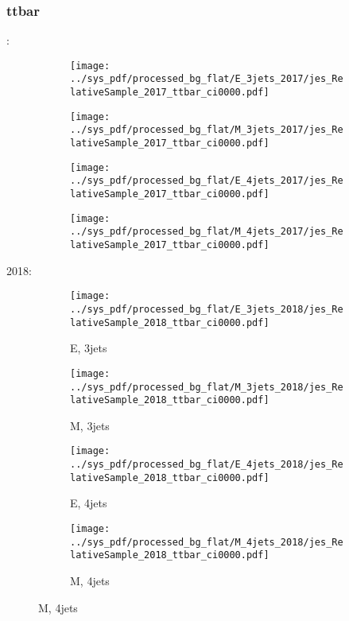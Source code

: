 \documentclass{beamer}
\begin{document}
\begin{frame}
\frametitle{ttbar}
\fontsize{5}{1}:
\begin{figure}
\centering
\begin{subfigure}[b]{0.24\textwidth}
\texttt{[image: ../sys\_pdf/processed\_bg\_flat/E\_3jets\_2017/jes\_RelativeSample\_2017\_ttbar\_ci0000.pdf]}
\end{subfigure}
\begin{subfigure}[b]{0.24\textwidth}
\texttt{[image: ../sys\_pdf/processed\_bg\_flat/M\_3jets\_2017/jes\_RelativeSample\_2017\_ttbar\_ci0000.pdf]}
\end{subfigure}
\begin{subfigure}[b]{0.24\textwidth}
\texttt{[image: ../sys\_pdf/processed\_bg\_flat/E\_4jets\_2017/jes\_RelativeSample\_2017\_ttbar\_ci0000.pdf]}
\end{subfigure}
\begin{subfigure}[b]{0.24\textwidth}
\texttt{[image: ../sys\_pdf/processed\_bg\_flat/M\_4jets\_2017/jes\_RelativeSample\_2017\_ttbar\_ci0000.pdf]}
\end{subfigure}
\end{figure}
2018:
\begin{figure}
\centering
\begin{subfigure}[b]{0.24\textwidth}
\texttt{[image: ../sys\_pdf/processed\_bg\_flat/E\_3jets\_2018/jes\_RelativeSample\_2018\_ttbar\_ci0000.pdf]}
\captionsetup{font=tiny}
\caption{E, 3jets}
\end{subfigure}
\begin{subfigure}[b]{0.24\textwidth}
\texttt{[image: ../sys\_pdf/processed\_bg\_flat/M\_3jets\_2018/jes\_RelativeSample\_2018\_ttbar\_ci0000.pdf]}
\captionsetup{font=tiny}
\caption{M, 3jets}
\end{subfigure}
\begin{subfigure}[b]{0.24\textwidth}
\texttt{[image: ../sys\_pdf/processed\_bg\_flat/E\_4jets\_2018/jes\_RelativeSample\_2018\_ttbar\_ci0000.pdf]}
\captionsetup{font=tiny}
\caption{E, 4jets}
\end{subfigure}
\begin{subfigure}[b]{0.24\textwidth}
\texttt{[image: ../sys\_pdf/processed\_bg\_flat/M\_4jets\_2018/jes\_RelativeSample\_2018\_ttbar\_ci0000.pdf]}
\captionsetup{font=tiny}
\caption{M, 4jets}
\end{subfigure}
\end{figure}
\end{frame}
\end{document}
